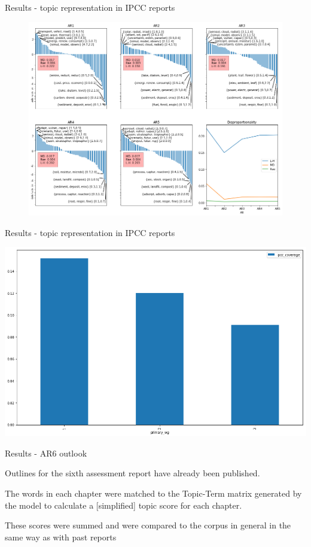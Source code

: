 \documentclass[9pt]{beamer}
\begin{document}
\begin{frame}{Results - topic representation in IPCC reports}

	\begin{figure}
			\includegraphics[width=0.8\linewidth]{../plots/ipcc_representation/ipcc_rep_662_ARs}
	\end{figure}

\end{frame}

\begin{frame}{Results - topic representation in IPCC reports}
	
	
	\includegraphics[width=0.8\linewidth]{../plots/ipcc_coverage_by_wg_654.png}
	
	
\end{frame}





\begin{frame}{Results - AR6 outlook}

Outlines for the sixth assessment report have already been published.

The words in each chapter were matched to the Topic-Term matrix generated by the model to calculate a [simplified] topic score for each chapter.

These scores were summed and were compared to the corpus in general in the same way as with past reports

\end{frame}
\end{document}

